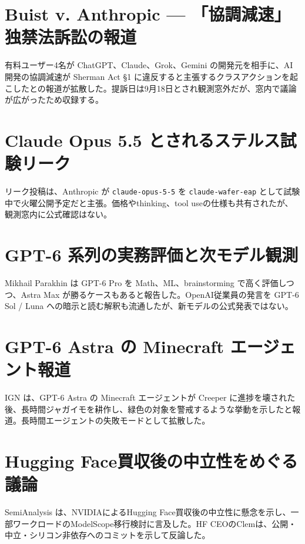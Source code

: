 \section{Buist v. Anthropic — 「協調減速」独禁法訴訟の報道}
有料ユーザー4名が ChatGPT、Claude、Grok、Gemini の開発元を相手に、AI開発の協調減速が Sherman Act §1 に違反すると主張するクラスアクションを起こしたとの報道が拡散した。提訴日は9月18日とされ観測窓外だが、窓内で議論が広がったため収録する。

\section{Claude Opus 5.5 とされるステルス試験リーク}
リーク投稿は、Anthropic が \texttt{claude-opus-5-5} を \texttt{claude-wafer-eap} として試験中で火曜公開予定だと主張。価格やthinking、tool useの仕様も共有されたが、観測窓内に公式確認はない。

\section{GPT-6 系列の実務評価と次モデル観測}
Mikhail Parakhin は GPT-6 Pro を Math、ML、brainstorming で高く評価しつつ、Astra Max が勝るケースもあると報告した。OpenAI従業員の発言を GPT-6 Sol / Luna への暗示と読む解釈も流通したが、新モデルの公式発表ではない。

\section{GPT-6 Astra の Minecraft エージェント報道}
IGN は、GPT-6 Astra の Minecraft エージェントが Creeper に進捗を壊された後、長時間ジャガイモを耕作し、緑色の対象を警戒するような挙動を示したと報道。長時間エージェントの失敗モードとして拡散した。

\section{Hugging Face買収後の中立性をめぐる議論}
SemiAnalysis は、NVIDIAによるHugging Face買収後の中立性に懸念を示し、一部ワークロードのModelScope移行検討に言及した。HF CEOのClemは、公開・中立・シリコン非依存へのコミットを示して反論した。

